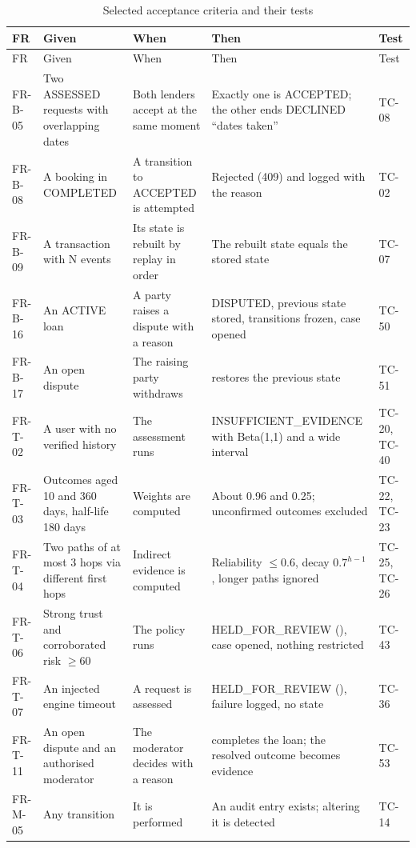 \begingroup\small
\begin{longtable}{@{}L{39pt}L{81pt}L{72pt}L{133pt}L{30pt}@{}}
\caption{Selected acceptance criteria and their tests}\label{tab:selected-acceptance-criteria-their}\\
\toprule
FR & Given & When & Then & Test \\
\midrule
\endfirsthead
\toprule
FR & Given & When & Then & Test \\
\midrule
\endhead
\bottomrule
\endlastfoot
FR-B-05 & Two ASSESSED requests with overlapping dates & Both lenders accept at the same moment & Exactly one is ACCEPTED; the other ends DECLINED ``dates taken'' & TC-08 \\
FR-B-08 & A booking in COMPLETED & A transition to ACCEPTED is attempted & Rejected (409) and logged with the reason & TC-02 \\
FR-B-09 & A transaction with N events & Its state is rebuilt by replay in  order & The rebuilt state equals the stored state & TC-07 \\
FR-B-16 & An ACTIVE loan & A party raises a dispute with a reason & DISPUTED, previous state stored, transitions frozen, case opened & TC-50 \\
FR-B-17 & An open dispute & The raising party withdraws &  restores the previous state & TC-51 \\
FR-T-02 & A user with no verified history & The assessment runs & INSUFFICIENT\_EVIDENCE with Beta(1,1) and a wide interval & TC-20, TC-40 \\
FR-T-03 & Outcomes aged 10 and 360 days, half-life 180 days & Weights are computed & About 0.96 and 0.25; unconfirmed outcomes excluded & TC-22, TC-23 \\
FR-T-04 & Two paths of at most 3 hops via different first hops & Indirect evidence is computed & Reliability $\leq 0.6$, decay $0.7^{h-1}$, longer paths ignored & TC-25, TC-26 \\
FR-T-06 & Strong trust and corroborated risk $\geq 60$ & The policy runs & HELD\_FOR\_REVIEW (), case opened, nothing restricted & TC-43 \\
FR-T-07 & An injected engine timeout & A request is assessed & HELD\_FOR\_REVIEW (), failure logged, no state & TC-36 \\
FR-T-11 & An open dispute and an authorised moderator & The moderator decides with a reason &  completes the loan; the resolved outcome becomes evidence & TC-53 \\
FR-M-05 & Any transition & It is performed & An audit entry exists; altering it is detected & TC-14 \\
\end{longtable}
\endgroup
